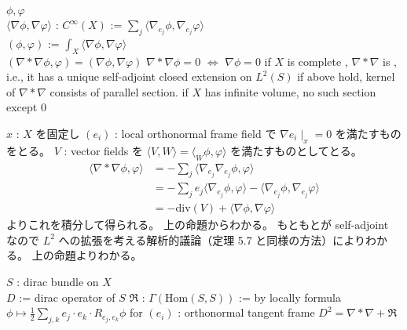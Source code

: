 \begin{Theorem}
\itemdefi
  \For \(\phi , \varphi\) \\
  \Define \(\langle \nabla \phi , \nabla \varphi \rangle\) : \(C^{\infty}(X)\) := \(\sum_j \langle \nabla_{e_j} \phi , \nabla_{e_j} \varphi \rangle\) \\
  \Define \((\phi , \varphi)\) := \(\int_X \langle \nabla \phi , \nabla \varphi \rangle\) \\
\itemprop
  \((\nabla * \nabla \phi , \varphi) = (\nabla \phi , \nabla \varphi)\)
\itemprop
  \(\nabla * \nabla \phi = 0\) \(\iff\) \(\nabla \phi = 0\)
\itemprop
  if \(X\) is complete , \(\nabla * \nabla\) is , i.e., it has a unique self-adjoint closed extension on \(L^2(S)\)
\itemprop
  if above hold, kernel of \(\nabla * \nabla\) consists of parallel section.
\itemprop
  if \(X\) has infinite volume, no such section except \(0\)
\end{Theorem}

\begin{Proof}
\itemprof
  \(x\) : \(X\) を固定し \((e_i)\) : local orthonormal frame field で \(\nabla e_i \mid_x = 0\) を満たすものをとる。
  \(V\) : vector fields を \(\langle V , W \rangle = \langle_W \phi , \varphi \rangle\) を満たすものとしてとる。
  \begin{align*}
    \langle \nabla * \nabla \phi , \varphi \rangle
    &= - \sum_j \langle \nabla_{e_j} \nabla_{e_j} \phi , \varphi \rangle \\
    &= - \sum_j e_j \langle \nabla_{e_j} \phi , \varphi \rangle - \langle \nabla_{e_j} \phi , \nabla_{e_j} \varphi \rangle \\
    &= - \text{div}(V) + \langle \nabla \phi , \nabla \varphi \rangle
  \end{align*}
  よりこれを積分して得られる。
\itemprof
  上の命題からわかる。
\itemprof
  もともとが self-adjoint なので \(L^2\) への拡張を考える解析的議論（定理 5.7 と同様の方法）によりわかる。
\itemprof
  上の命題よりわかる。
\itemprof
  \SORRY
\end{Proof}

\begin{Theorem}
\itemwhen
  \Fix \(S\) : dirac bundle on \(X\) \\
  \Fix \(D\) := dirac operator of \(S\)
\itemdefi
  \Define \(\mathfrak{R}\) : \(\Gamma(\text{Hom}(S,S))\) := by locally formula \(\phi \mapsto \frac{1}{2} \sum_{j,k} e_j \cdot e_k \cdot R_{e_j , e_k} \phi\) for \((e_i)\) : orthonormal tangent frame
\itemprop
  \(D^2 = \nabla * \nabla + \mathfrak{R}\)
\end{Theorem}

